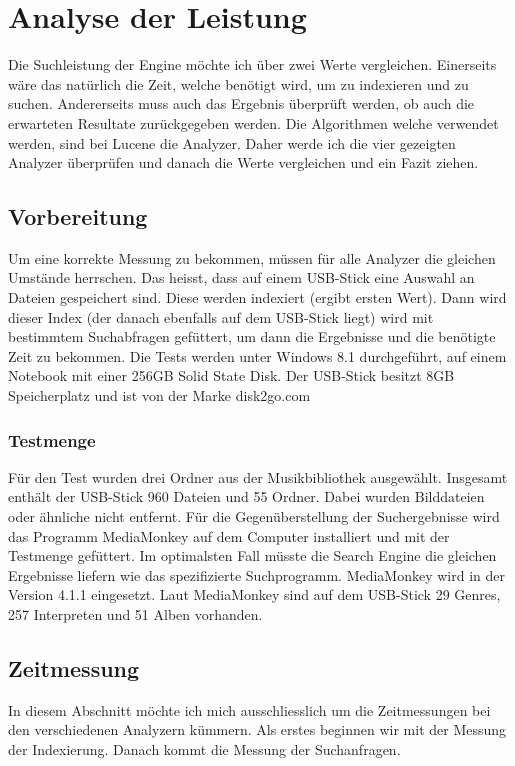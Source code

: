 \documentclass[12pt,a4paper,ngerman]{report}
\begin{document}
\section*{Analyse der Leistung}
Die Suchleistung der Engine möchte ich über zwei Werte vergleichen. Einerseits wäre das natürlich die Zeit, welche benötigt wird, um zu indexieren und zu suchen. Andererseits muss auch das Ergebnis überprüft werden, ob auch die erwarteten Resultate zurückgegeben werden. Die Algorithmen welche verwendet werden, sind bei Lucene die Analyzer. Daher werde ich die vier gezeigten Analyzer überprüfen und danach die Werte vergleichen und ein Fazit ziehen.
\subsection*{Vorbereitung}
Um eine korrekte Messung zu bekommen, müssen für alle Analyzer die gleichen Umstände herrschen. Das heisst, dass auf einem USB-Stick eine Auswahl an Dateien gespeichert sind. Diese werden indexiert (ergibt ersten Wert). Dann wird dieser Index (der danach ebenfalls auf dem USB-Stick liegt) wird mit bestimmtem Suchabfragen gefüttert, um dann die Ergebnisse und die benötigte Zeit zu bekommen. Die Tests werden unter Windows 8.1 durchgeführt, auf einem Notebook mit einer 256GB Solid State Disk. Der USB-Stick besitzt 8GB Speicherplatz und ist von der Marke disk2go.com\\
\subsubsection*{Testmenge}
Für den Test wurden drei Ordner aus der Musikbibliothek ausgewählt. Insgesamt enthält der USB-Stick 960 Dateien und 55 Ordner. Dabei wurden Bilddateien oder ähnliche nicht entfernt. Für die Gegenüberstellung der Suchergebnisse wird das Programm MediaMonkey auf dem Computer installiert und mit der Testmenge gefüttert. Im optimalsten Fall müsste die Search Engine die gleichen Ergebnisse liefern wie das spezifizierte Suchprogramm. MediaMonkey wird in der Version 4.1.1 eingesetzt. Laut MediaMonkey sind auf dem USB-Stick 29 Genres, 257 Interpreten und 51 Alben vorhanden.
\subsection*{Zeitmessung}
In diesem Abschnitt möchte ich mich ausschliesslich um die Zeitmessungen bei den verschiedenen Analyzern kümmern. Als erstes beginnen wir mit der Messung der Indexierung. Danach kommt die Messung der Suchanfragen.
\end{document}
